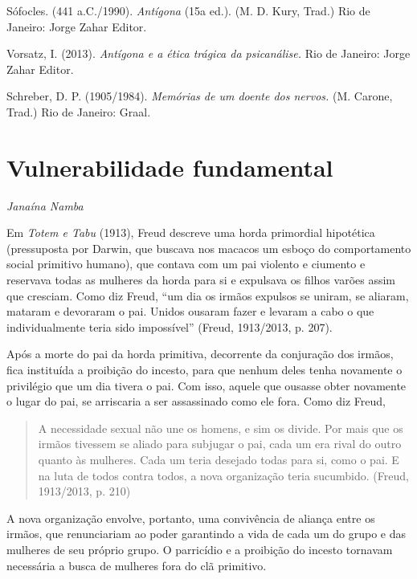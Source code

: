 Sófocles. (441 a.C./1990). \emph{Antígona} (15a ed.). (M. D. Kury,
Trad.) Rio de Janeiro: Jorge Zahar Editor.

Vorsatz, I. (2013). \emph{Antígona e a ética trágica da psicanálise.}
Rio de Janeiro: Jorge Zahar Editor.

Schreber, D. P. (1905/1984). \emph{Memórias de um doente dos nervos.}
(M. Carone, Trad.) Rio de Janeiro: Graal.



\chapter*{Vulnerabilidade fundamental}

\begin{flushright}
\emph{Janaína Namba}
\end{flushright}

Em \emph{Totem e Tabu} (1913), Freud descreve uma horda primordial
hipotética (pressuposta por Darwin, que buscava nos macacos um esboço do
comportamento social primitivo humano), que contava com um pai violento
e ciumento e reservava todas as mulheres da horda para si e expulsava os
filhos varões assim que cresciam. Como diz Freud, ``um dia os irmãos
expulsos se uniram, se aliaram, mataram e devoraram o pai. Unidos
ousaram fazer e levaram a cabo o que individualmente teria sido
impossível'' (Freud, 1913/2013, p. 207).

Após a morte do pai da horda primitiva, decorrente da conjuração dos
irmãos, fica instituída a proibição do incesto, para que nenhum deles
tenha novamente o privilégio que um dia tivera o pai. Com isso, aquele
que ousasse obter novamente o lugar do pai, se arriscaria a ser
assassinado como ele fora. Como diz Freud,

\begin{quote}
A necessidade sexual não une os homens, e sim os divide. Por mais que os
irmãos tivessem se aliado para subjugar o pai, cada um era rival do
outro quanto às mulheres. Cada um teria desejado todas para si, como o
pai. E na luta de todos contra todos, a nova organização teria
sucumbido. (Freud, 1913/2013, p. 210)
\end{quote}

A nova organização envolve, portanto, uma convivência de aliança entre
os irmãos, que renunciariam ao poder garantindo a vida de cada um do
grupo e das mulheres de seu próprio grupo. O parricídio e a proibição do
incesto tornavam necessária a busca de mulheres fora do clã primitivo.

